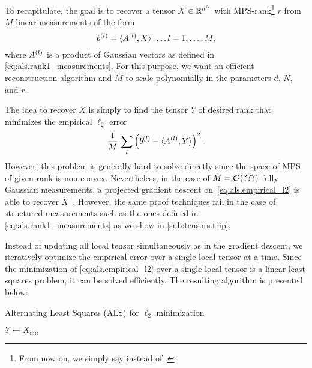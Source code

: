 To recapitulate, the goal is to recover a tensor $X \in {\mathbb{R}}^{d^N}$ with MPS-rank\footnote{%
  From now on, we simply say  instead of .
} $r$ from $M$ linear measurements of the form
\[
  b^{(l)} = \braket{A^{(l)}, X}, \ldots l=1,\ldots,M,
\]
where $A^{(l)}$ is a product of Gaussian vectors as defined in \cref{eq:als.rank1_measurements}.
For this purpose, we want an efficient reconstruction algorithm and $M$ to scale polynomially in the parameters $d$, $N$, and $r$.

The idea to recover $X$ is simply to find the tensor $Y$ of desired rank that minimizes the empirical $\ell_2$ error
\[
  \frac{1}{M} \, \sum_l \left( b^{(l)} - \braket{A^{(l)}, Y} \right)^2.
  \label{eq:als.empirical_l2}
\]
However, this problem is generally hard to solve directly since the space of MPS of given rank is non-convex.
Nevertheless, in the case of $M={\mathcal{O}}(???)$ fully Gaussian measurements, a projected gradient descent on~\eqref{eq:als.empirical_l2} is able to recover $X$~\cite{Rauhut_2014_Tensor,Rauhut_2016_Low}.
However, the same proof techniques fail in the case of structured measurements such as the ones defined in \cref{eq:als.rank1_measurements} as we show in \cref{sub:tensors.trip}.

Instead of updating all local tensor simultaneously as in the gradient descent, we iteratively optimize the empirical error over a single local tensor at a time.
Since the minimization of \cref{eq:als.empirical_l2} over a single local tensor is a linear-least squares problem, it can be solved efficiently.
The resulting algorithm is presented below:

\begin{algorithm}[H]
  \caption{\label{alg:als}Alternating Least Squares (ALS) for $\ell_2$ minimization}

  \BlankLine

  $Y \gets X_\mathrm{init}$


\end{algorithm}

